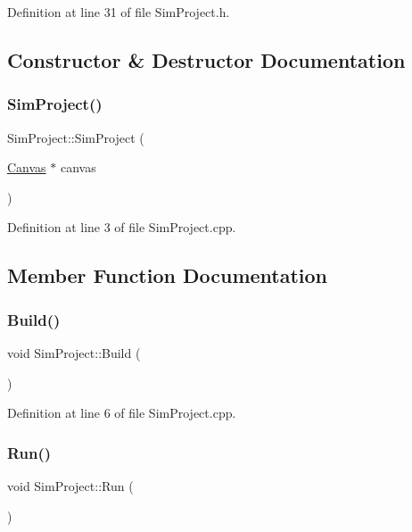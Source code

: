 Definition at line 31 of file Sim\+Project.\+h.



\subsection{Constructor \& Destructor Documentation}
\mbox{\label{class_sim_project_a970fe219d4659b02bf5e870a69351399}} 
\subsubsection{\texorpdfstring{Sim\+Project()}{SimProject()}}
{\footnotesize\ttfamily Sim\+Project\+::\+Sim\+Project (\begin{DoxyParamCaption}\item[{\hyperlink{class_canvas}{Canvas} $\ast$}]{canvas }\end{DoxyParamCaption})}



Definition at line 3 of file Sim\+Project.\+cpp.



\subsection{Member Function Documentation}
\mbox{\label{class_sim_project_afefd1eb6d63ea4e0c698084d51a29fcd}} 
\subsubsection{\texorpdfstring{Build()}{Build()}}
{\footnotesize\ttfamily void Sim\+Project\+::\+Build (\begin{DoxyParamCaption}{ }\end{DoxyParamCaption})}



Definition at line 6 of file Sim\+Project.\+cpp.

\mbox{\label{class_sim_project_a955725a364c7a26c2991a0013976fc73}} 
\subsubsection{\texorpdfstring{Run()}{Run()}}
{\footnotesize\ttfamily void Sim\+Project\+::\+Run (\begin{DoxyParamCaption}{ }\end{DoxyParamCaption})}



